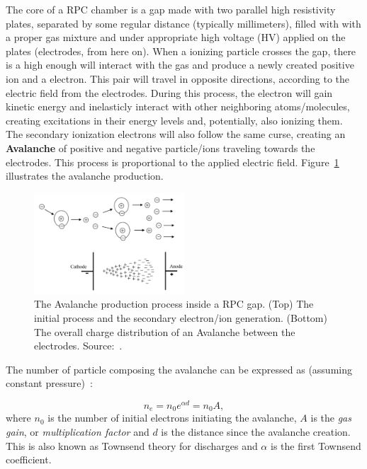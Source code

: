 The core of a RPC chamber is a gap made with two parallel high resistivity plates, separated by some regular distance (typically millimeters), filled with with a proper gas mixture and under appropriate high voltage (HV) applied on the plates (electrodes, from here on). When a ionizing particle crosses the gap, there is a high enough  will interact with the gas and produce a newly created positive ion and a electron. This pair will travel in opposite directions, according to the electric field from the electrodes. During this process, the electron will gain kinetic energy and inelasticly interact with other neighboring atoms/molecules, creating excitations in their energy levels and, potentially, also ionizing them. The secondary ionization electrons will also follow the same curse, creating an \textbf{Avalanche} of positive and negative particle/ions traveling towards the electrodes. This process is proportional to the applied electric field. Figure~\ref{avalanche} illustrates the avalanche production.


\begin{figure}[h]
    \begin{center}
    \includegraphics[width=0.5\textwidth,keepaspectratio]{figures_and_tables/rpc/avalanche_prod.png}
    \end{center}
    \caption{The Avalanche production process inside a RPC gap. (Top) The initial process and the secondary electron/ion generation. (Bottom) The overall charge distribution of an Avalanche between the electrodes. Source:~\cite{livro_descarga}.}
    \label{avalanche}
\end{figure}

The number of particle composing the avalanche can be expressed as (assuming constant pressure)~\cite{livro_descarga}:

\begin{equation}
    n_{e}=n_{0}e^{\alpha d} = n_{0}A,
\end{equation}
where $n_{0}$ is the number of initial electrons initiating the avalanche, $A$ is the \textit{gas gain}, or \textit{multiplication factor} and $d$ is the distance since the avalanche creation. This is also known as Townsend theory for discharges and $\alpha$ is the first Townsend coefficient.

